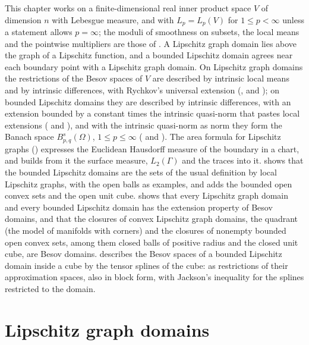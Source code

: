 This chapter works on a finite-dimensional real inner product space $V$ of dimension $n$ with
Lebesgue measure, and with $L_p = L_p(V)$ for $1 \leq p < \infty$ unless a statement allows
$p = \infty$; the moduli of smoothness on
subsets, the local means and the pointwise multipliers are those of . A Lipschitz
graph domain lies above the graph of a Lipschitz function, and a bounded Lipschitz domain agrees
near each boundary point with a Lipschitz graph domain. On Lipschitz graph domains the
restrictions of the Besov spaces of $V$ are described by intrinsic local means and by intrinsic
differences, with Rychkov's universal extension (,
 and ); on bounded Lipschitz domains
they are described by intrinsic differences, with an extension bounded by a constant times the
intrinsic quasi-norm that pastes local extensions ( and
), and with the intrinsic quasi-norm as norm they form the
Banach space $B^s_{p,q}(\Omega)$, $1 \leq p \leq \infty$ ( and
). The area formula for Lipschitz graphs
() expresses the Euclidean Hausdorff measure of the boundary in a
chart, and  builds from it the surface measure, $L_2(\Gamma)$ and the
traces into it.  shows that the bounded Lipschitz domains are
the sets of the usual definition by local Lipschitz graphs, with the open balls as examples, and
 adds the bounded open convex sets and the open unit cube.
 shows that every Lipschitz graph domain and every bounded Lipschitz
domain has the extension property of Besov domains, and that the closures of convex Lipschitz
graph domains, the quadrant (the model of manifolds with corners) and the closures of nonempty
bounded open convex sets, among them closed balls of positive radius and the closed unit cube,
are Besov domains.  describes the Besov spaces of a bounded Lipschitz
domain inside a cube by the tensor splines of the cube: as restrictions of their approximation
spaces, also in block form, with Jackson's inequality for the splines restricted to the domain.

\section{Lipschitz graph domains}

